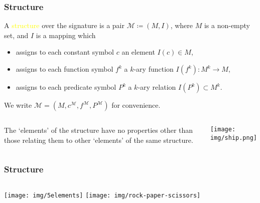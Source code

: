 \documentclass[UTF8,aspectratio=43,11pt,colorlinks,compress,openany]{beamer}%
\begin{document}
\begin{frame}\frametitle{Structure}
		A \textcolor{yellow}{structure} over the signature is a pair $\mathcal{M}\coloneqq (M,I)$, where $M$ is a non-empty set, and $I$ is a mapping which
		\begin{itemize}
			\item assigns to each constant symbol $c$ an element $I(c)\in M$,
			\item assigns to each function symbol $f^k$ a $k$-ary function $I(f^k): M^k\to M$,
			\item assigns to each predicate symbol $P^k$ a $k$-ary relation $I(P^k)\subset M^k$.
		\end{itemize}
		We write $\mathcal{M}=\left(M,c^{\mathcal{M}},f^{\mathcal{M}},P^{\mathcal{M}}\right)$ for convenience.
		\begin{columns}
				\begin{block}{}
					The `elements' of the structure have no properties other than those relating them to other `elements' of the same structure.
				\end{block}
				\centering\texttt{[image: img/ship.png]}
		\end{columns}
\end{frame}

\begin{frame}\frametitle{Structure}
		\begin{columns}[onlytextwidth]
		\column{.45\textwidth}
		\texttt{[image: img/5elements]}
		\column{.45\textwidth}
		\texttt{[image: img/rock-paper-scissors]}
		\end{columns}\vspace{-7ex}
				\begin{center}
				\end{center}
\end{frame}
\end{document}
